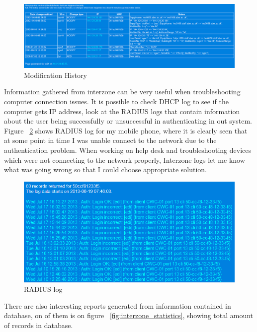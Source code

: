 \documentclass[10pt,a4paper,headinclude=true]{report}
\begin{document}
\begin{figure}[H]
\centering
\centerline{\includegraphics[scale=0.5]{./modification_history}}
\caption{Modification History}
\label{fig:modification_history}
\end{figure}

Information gathered from interzone can be very useful when troubleshooting computer connection issues. It is possible to check DHCP log to see if the computer gets IP address, look at the RADIUS logs that contain information about the user being successfully or unsuccessful in authenticating in out system. Figure ~\ref{fig:interzone_radius} shows RADIUS log for my mobile phone, where it is clearly seen that at some point in time I was unable connect to the network due to the authentication problem. When working on help desk and troubleshooting devices which were not connecting to the network properly, Interzone logs let me know what was going wrong so that I could choose appropriate solution. 

\begin{figure}[H]
\centering
\centerline{\includegraphics[scale=0.5]{./interzone_radius}}
\caption{RADIUS log}
\label{fig:interzone_radius}
\end{figure}

There are also interesting reports generated from information contained in database, on of them is on figure ~\ref{fig:interzone_statistics}, showing total amount of records in database.
\end{document}
